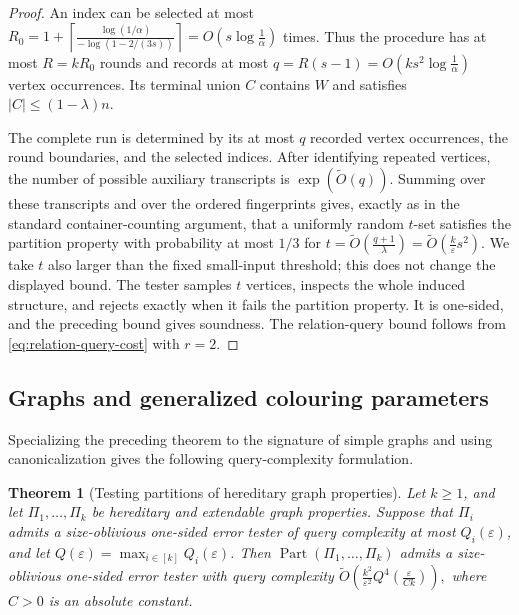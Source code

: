 \documentclass[11pt,reqno,letterpaper]{amsart}
\newcommand{\Part}{\operatorname{Part}}
\theoremstyle{plain}
\newtheorem{thm}{Theorem}[section]
\theoremstyle{remark}
\begin{document}
\begin{proof}
An index can be selected at most
\(R_0= 1+\left\lceil \frac{\log(1/\alpha)}{-\log(1-2/(3s))} \right\rceil =O\!\left(s\log\frac1\alpha\right)\)
times.  Thus the procedure has at most $R=kR_0$ rounds and records at most
\(q=R(s-1) =O\!\left(ks^2\log\frac1\alpha\right)\)
vertex occurrences.  Its terminal union $C$ contains $W$ and satisfies
$|C|\leq(1-\lambda)n$.

The complete run is determined by its at most $q$ recorded vertex
occurrences, the round boundaries, and the selected indices.  After identifying
repeated vertices, the number of possible auxiliary transcripts is
$\exp(\widetilde O(q))$.  Summing over these transcripts and over the ordered
fingerprints gives, exactly as in the standard container-counting argument, that
a uniformly random $t$-set satisfies the partition property with probability at
most $1/3$ for
\(t=\widetilde O\!\left(\frac{q+1}{\lambda}\right)
 =\widetilde O\!\left(\frac{k}{\varepsilon}s^2\right).\)
We take $t$ also larger than the fixed small-input threshold; this does not
change the displayed bound.  The tester samples $t$ vertices, inspects the
whole induced structure, and rejects exactly when it fails the partition
property.  It is one-sided, and the preceding bound gives soundness.  The
relation-query bound follows from \eqref{eq:relation-query-cost} with $r=2$.
\end{proof}

\subsection{Graphs and generalized colouring parameters}

Specializing the preceding theorem to the signature of simple graphs and using canonicalization gives the following query-complexity formulation.

\begin{thm}[Testing partitions of hereditary graph properties]
\label{thm:partitioned-hereditary-properties}
Let $k\geq1$, and let $\Pi_1,\dots,\Pi_k$ be hereditary and extendable graph properties.  Suppose that $\Pi_i$ admits a size-oblivious one-sided error tester of query complexity at most $Q_i(\varepsilon)$, and let
\(Q(\varepsilon)=\max_{i\in[k]}Q_i(\varepsilon)\).
Then $\Part(\Pi_1,\dots,\Pi_k)$ admits a size-oblivious one-sided error tester with query complexity
\(\widetilde O\!\left( \frac{k^2}{\varepsilon^2} Q^4\!\left(\frac{\varepsilon}{Ck}\right) \right),\)
where $C>0$ is an absolute constant.
\end{thm}
\end{document}
